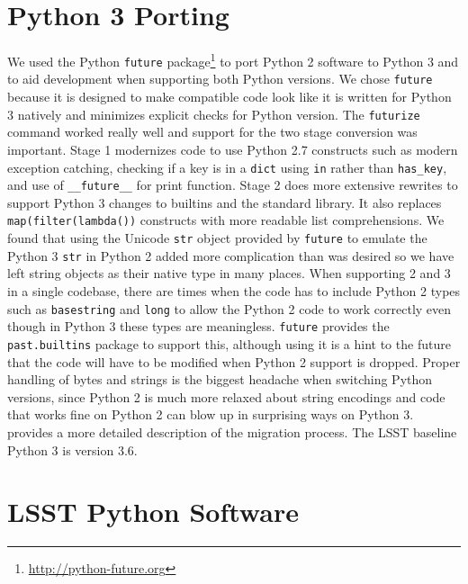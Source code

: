 \documentclass[11pt,twoside]{article}
\begin{document}
\section{Python 3 Porting}

We used the Python \verb|future| package\footnote{\url{http://python-future.org}} to port Python 2 software to Python 3 and to aid development when supporting both Python versions.
We chose \verb|future| because it is designed to make compatible code look like it is written for Python 3 natively and minimizes explicit checks for Python version.
The \verb|futurize| command worked really well and support for the two stage conversion was important.
Stage 1 modernizes code to use Python 2.7 constructs such as modern exception catching, checking if a key is in a \texttt{dict} using \verb|in| rather than \verb|has_key|, and use of \verb|__future__| for print function.
Stage 2 does more extensive rewrites to support Python 3 changes to builtins and the standard library.
It also replaces \verb|map(filter(lambda())| constructs with more readable list comprehensions.
We found that using the Unicode \verb|str| object provided by \verb|future| to emulate the Python 3 \verb|str| in Python 2 added more complication than was desired so we have left string objects as their native type in many places.
When supporting 2 and 3 in a single codebase, there are times when the code has to include Python 2 types such as \texttt{basestring} and \texttt{long} to allow the Python 2 code to work correctly even though in Python 3 these types are meaningless.
\verb|future| provides the \texttt{past.builtins} package to support this, although using it is a hint to the future that the code will have to be modified when Python 2 support is dropped.
Proper handling of bytes and strings is the biggest headache when switching Python versions, since Python 2 is much more relaxed about string encodings and code that works fine on Python 2 can blow up in surprising ways on Python 3.
\citet{SQR-014} provides a more detailed description of the migration process.
The LSST baseline Python 3 is version 3.6.

\section{LSST Python Software}
\end{document}
